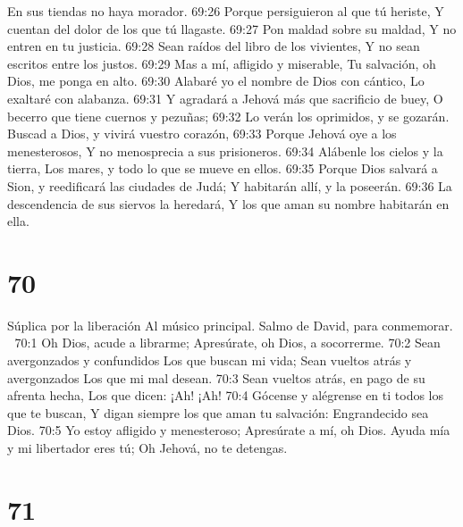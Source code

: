 En sus tiendas no haya morador. 
69:26 Porque persiguieron al que tú heriste, 
Y cuentan del dolor de los que tú llagaste. 
69:27 Pon maldad sobre su maldad, 
Y no entren en tu justicia. 
69:28 Sean raídos del libro de los vivientes, 
Y no sean escritos entre los justos. 
69:29 Mas a mí, afligido y miserable, 
Tu salvación, oh Dios, me ponga en alto. 
69:30 Alabaré yo el nombre de Dios con cántico, 
Lo exaltaré con alabanza. 
69:31 Y agradará a Jehová más que sacrificio de buey, 
O becerro que tiene cuernos y pezuñas; 
69:32 Lo verán los oprimidos, y se gozarán. 
Buscad a Dios, y vivirá vuestro corazón, 
69:33 Porque Jehová oye a los menesterosos, 
Y no menosprecia a sus prisioneros. 
69:34 Alábenle los cielos y la tierra, 
Los mares, y todo lo que se mueve en ellos. 
69:35 Porque Dios salvará a Sion, y reedificará las ciudades de Judá; 
Y habitarán allí, y la poseerán. 
69:36 La descendencia de sus siervos la heredará, 
Y los que aman su nombre habitarán en ella. 

\chapter{70}

Súplica por la liberación 
Al músico principal. Salmo de David, para conmemorar. 

70:1 Oh Dios, acude a librarme; 
Apresúrate, oh Dios, a socorrerme. 
70:2 Sean avergonzados y confundidos 
Los que buscan mi vida; 
Sean vueltos atrás y avergonzados 
Los que mi mal desean. 
70:3 Sean vueltos atrás, en pago de su afrenta hecha, 
Los que dicen: ¡Ah! ¡Ah! 
70:4 Gócense y alégrense en ti todos los que te buscan, 
Y digan siempre los que aman tu salvación: 
Engrandecido sea Dios. 
70:5 Yo estoy afligido y menesteroso; 
Apresúrate a mí, oh Dios. 
Ayuda mía y mi libertador eres tú; 
Oh Jehová, no te detengas. 

\chapter{71}

